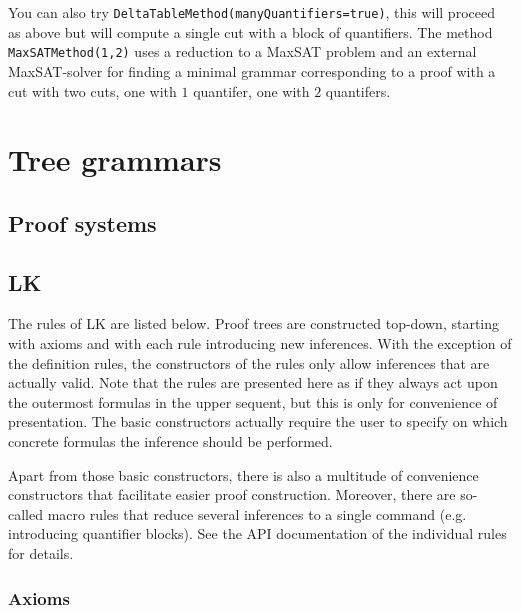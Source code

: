 \documentclass[a4paper,11pt]{article}
\begin{document}
You can also try \texttt{DeltaTableMethod(manyQuantifiers=true)}, this will proceed as above but will
compute a single cut with a block of quantifiers.  The method \texttt{MaxSATMethod(1,2)}
uses a reduction to a MaxSAT problem and an external MaxSAT-solver for finding a
minimal grammar corresponding to a proof with a cut with two cuts, one with $1$
quantifer, one with $2$ quantifers.

\section{Tree grammars}


\vfill
\pagebreak
\begin{appendix}

\section{Proof systems}

\subsection{LK}\label{app:sequent_calculus}


The rules of LK are listed below. Proof trees are constructed top-down, starting with axioms and with each rule introducing new inferences. With the exception of the definition rules, the constructors of the rules only allow inferences that are actually valid. Note that the rules are presented here as if they always act upon the outermost formulas in the upper sequent, but this is only for convenience of presentation. The basic constructors actually require the user to specify on which concrete formulas the inference should be performed.

Apart from those basic constructors, there is also a multitude of convenience constructors that facilitate easier proof construction. Moreover, there are so-called macro rules that reduce several inferences to a single command (e.g. introducing quantifier blocks). See the API documentation of the individual rules for details. 

\subsubsection*{Axioms}


\end{appendix}
\end{document}
